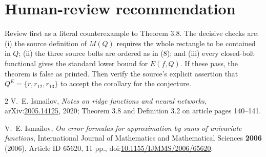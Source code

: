 \documentclass[11pt]{article}
\begin{document}
\section{Human-review recommendation}

Review first as a literal counterexample to Theorem 3.8. The decisive checks
are: (i) the source definition of $M(Q)$ requires the whole rectangle to be
contained in $Q$; (ii) the three source bolts are ordered as in (8); and
(iii) every closed-bolt functional gives the standard lower bound for
$E(f,Q)$. If these pass, the theorem is false as printed. Then verify the
source's explicit assertion that $Q^E=\{r,r_{12},r_{13}\}$ to accept the
corollary for the conjecture.

\begin{thebibliography}{2}
V.~E. Ismailov,
\emph{Notes on ridge functions and neural networks},
arXiv:\href{https://arxiv.org/abs/2005.14125}{2005.14125},
2020; Theorem 3.8 and Definition 3.2 on article pages 140--141.

V.~E. Ismailov,
\emph{On error formulas for approximation by sums of univariate functions},
International Journal of Mathematics and Mathematical Sciences
\textbf{2006} (2006), Article ID 65620, 11 pp.,
doi:\href{https://doi.org/10.1155/IJMMS/2006/65620}
{10.1155/IJMMS/2006/65620}.
\end{thebibliography}
\end{document}
